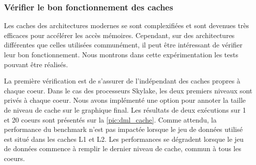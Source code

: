     
    
    

    \subsubsection{Vérifier le bon fonctionnement des caches} \label{sec:dml_cache_ok}
        Les caches des architectures modernes se sont complexifiées et sont devenues très efficaces pour accélérer les accès mémoires. Cependant, sur des architectures différentes que celles utilisées communément, il peut être intéressant de vérifier leur bon fonctionnement. Nous montrons dans cette expérimentation les tests pouvant être réalisés.
        
        La première vérification est de s'assurer de l'indépendant des caches propres à chaque coeur. Dans le cas des processeurs Skylake, les deux premiers niveaux sont privés à chaque coeur. Nous avons implémenté une option pour annoter la taille de niveau de cache sur le graphique final. Les résultats de deux exécutions sur 1 et 20 coeurs sont présentés sur la \autoref{pic:dml_cache}. Comme attendu, la performance du benchmark n'est pas impactée lorsque le jeu de données utilisé est situé dans les caches L1 et L2. Les performances se dégradent lorsque le jeu de données commence à remplir le dernier niveau de cache, commun à tous les coeurs.
        
